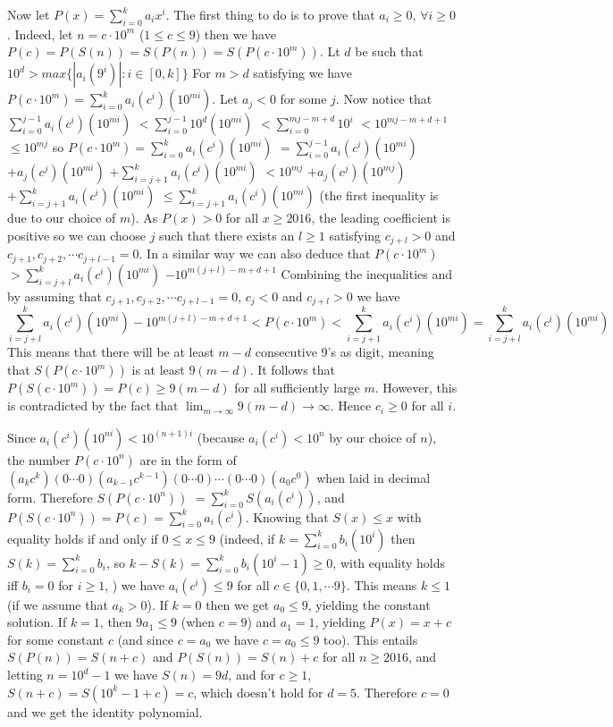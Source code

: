 \documentclass[11pt,a4paper]{article}
\begin{document}
\begin{itemize}
Now let $P(x)=\displaystyle\sum_{i=0}^k a_ix^i$. 
The first thing to do is to prove that $a_i\ge 0$, $\forall i\ge 0$. 
Indeed, let $n=c\cdot 10^m$ ($1\le c\le 9$) then we have 
$P(c)=P(S(n))=S(P(n))=S(P(c\cdot 10^m))$. 
Lt $d$ be such that 
$10^{d}>max\{|a_i(9^i)| : i\in [0, k]\}$
For $m>d$ satisfying we have 
$P(c\cdot 10^m)=\displaystyle\sum_{i=0}^k a_i (c^i)(10^{mi})$. 
Let $a_j<0$ for some $j$. 
Now notice that 
$\displaystyle\sum_{i=0}^{j-1} a_i (c^i)(10^{mi})$
$<\displaystyle\sum_{i=0}^{j-1} 10^{d}(10^{mi})$
$<\displaystyle\sum_{i=0}^{mj-m+d} 10^i$
$<10^{mj-m+d+1}$
$\le 10^{mj}$
so
$P(c\cdot 10^m)=\displaystyle\sum_{i=0}^k a_i (c^i)(10^{mi})$
$=\displaystyle\sum_{i=0}^{j-1} a_i (c^i)(10^{mi})$
$+a_j(c^j)(10^{mi})$
$+\displaystyle\sum_{i=j+1}^{k} a_i (c^i)(10^{mi})$
$<10^{mj}$
$+a_j(c^j)(10^{mj})$
$+\displaystyle\sum_{i=j+1}^{k} a_i (c^i)(10^{mi})$
$\le\displaystyle\sum_{i=j+1}^{k} a_i (c^i)(10^{mi})$
(the first inequality is due to our choice of $m$). 
As $P(x)>0$ for all $x\ge 2016$, the leading coefficient is positive so we can choose $j$ such that there exists an $l\ge 1$ satisfying 
$c_{j+l}>0$ and $c_{j+1}, c_{j+2}, \cdots c_{j+l-1}=0$. 
In a similar way we can also deduce that 
$P(c\cdot 10^m)$
$>\displaystyle\sum_{i=j+l}^{k} a_i (c^i)(10^{mi})$
$-10^{m(j+l)-m+d+1}$
Combining the inequalities and by assuming that $c_{j+1}, c_{j+2}, \cdots c_{j+l-1}=0$, $c_j<0$ and $c_{j+l}>0$ we have 
\[
\displaystyle\sum_{i=j+l}^{k} a_i (c^i)(10^{mi})
-10^{m(j+l)-m+d+1}
<P(c\cdot 10^m)
<\displaystyle\sum_{i=j+1}^{k} a_i (c^i)(10^{mi})
=\displaystyle\sum_{i=j+l}^{k} a_i (c^i)(10^{mi})\]
This means that there will be at least $m-d$ consecutive 9's as digit, meaning that $S(P(c\cdot 10^m))$ is at least $9(m-d)$. 
It follows that $P(S(c\cdot 10^m))=P(c)\ge 9(m-d)$ for all sufficiently large $m$. 
However, this is contradicted by the fact that $\lim_{m\to\infty}9(m-d)\to\infty$. 
Hence $c_i\ge 0$ for all $i$. 

Since $a_i (c^i)(10^{ni}) < 10^{(n+1)i}$ (because $a_i(c^i)<10^n$ by our choice of $n$), 
the number $P(c\cdot 10^n)$ are in the form of $(a_kc^k)(0\cdots 0) (a_{k-1}c^{k-1})(0\cdots 0)\cdots(0\cdots 0)(a_0c^0)$ when laid in decimal form. 
Therefore 
$S(P(c\cdot 10^n))$
$=\displaystyle\sum_{i=0}^k S(a_i (c^i))$, 
and 
$P(S(c\cdot 10^n))=P(c)=\displaystyle\sum_{i=0}^k a_i (c^i)$. 
Knowing that $S(x)\le x$ with equality holds if and only if $0\le x\le 9$ 
(indeed, if $k=\displaystyle\sum_{i=0}^k b_i(10^i)$ then $S(k)=\displaystyle\sum_{i=0}^k b_i$, 
so $k-S(k)=\displaystyle\sum_{i=0}^k b_i(10^i -1)\ge 0$, 
with equality holds iff $b_i=0$ for $i\ge 1$, )
we have $a_i(c^i)\le 9$ for all $c\in \{0,1,\cdots 9\}$. 
This means $k\le 1$ (if we assume that $a_k > 0$). 
If $k=0$ then we get $a_0\le 9$, yielding the constant solution. 
If $k=1$, then $9a_1\le 9$ (when $c=9$) and $a_1=1$, yielding $P(x)=x+c$ for some constant $c$ 
(and since $c=a_0$ we have $c=a_0\le 9$ too). 
This entails $S(P(n))=S(n+c)$ and $P(S(n))=S(n)+c$ for all $n\ge 2016$, 
and letting $n=10^d-1$ we have $S(n)=9d$, and for $c\ge 1$, $S(n+c)=S(10^k-1+c)=c$, which doesn't hold for $d=5$. 
Therefore $c=0$ and we get the identity polynomial. 


\end{itemize}
\end{document}
